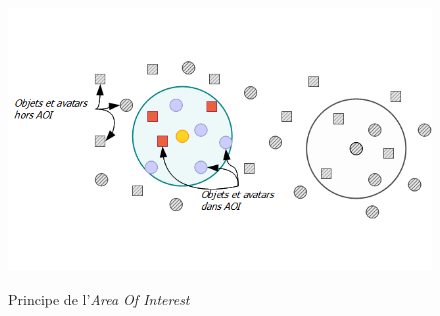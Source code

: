 	\vspace{5mm}
        \begin{figure}[!h]
        \centering
        \includegraphics[scale=0.7]{../Images/AOI.png}\\
        \caption{Principe de l'\textit{Area Of Interest}}
        \label{AOI}
        \end{figure}
	\vspace{5mm}
